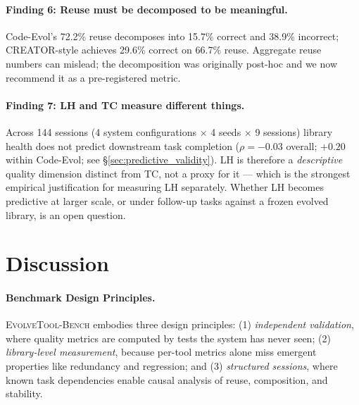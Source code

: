 \documentclass[sigconf,anonymous,review,natbib=false]{acmart}
\begin{document}
\paragraph{Finding 6: Reuse must be decomposed to be meaningful.} Code-Evol's 72.2\% reuse decomposes into 15.7\% correct and 38.9\% incorrect; CREATOR-style achieves 29.6\% correct on 66.7\% reuse. Aggregate reuse numbers can mislead; the decomposition was originally post-hoc and we now recommend it as a pre-registered metric.

\paragraph{Finding 7: LH and TC measure different things.} Across 144 sessions (4 system configurations $\times$ 4 seeds $\times$ 9 sessions) library health does not predict downstream task completion ($\rho = -0.03$ overall; $+0.20$ within Code-Evol; see \S\ref{sec:predictive_validity}). LH is therefore a \emph{descriptive} quality dimension distinct from TC, not a proxy for it --- which is the strongest empirical justification for measuring LH separately. Whether LH becomes predictive at larger scale, or under follow-up tasks against a frozen evolved library, is an open question.

\section{Discussion}

\paragraph{Benchmark Design Principles.} \textsc{EvolveTool-Bench} embodies three design principles: (1) \emph{independent validation}, where quality metrics are computed by tests the system has never seen; (2) \emph{library-level measurement}, because per-tool metrics alone miss emergent properties like redundancy and regression; and (3) \emph{structured sessions}, where known task dependencies enable causal analysis of reuse, composition, and stability.
\end{document}
